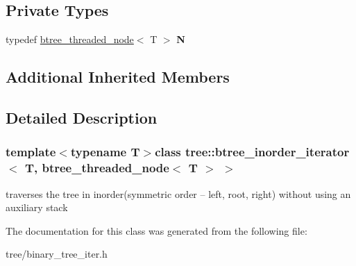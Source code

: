\subsection*{Private Types}
\begin{DoxyCompactItemize}
\item 
\hypertarget{classtree_1_1btree__inorder__iterator_3_01T_00_01btree__threaded__node_3_01T_01_4_01_4_a5c79484a07c883063ddbf6a545880231}{typedef \hyperlink{structtree_1_1btree__threaded__node}{btree\-\_\-threaded\-\_\-node}$<$ T $>$ {\bfseries N}}\label{classtree_1_1btree__inorder__iterator_3_01T_00_01btree__threaded__node_3_01T_01_4_01_4_a5c79484a07c883063ddbf6a545880231}

\end{DoxyCompactItemize}
\subsection*{Additional Inherited Members}


\subsection{Detailed Description}
\subsubsection*{template$<$typename T$>$class tree\-::btree\-\_\-inorder\-\_\-iterator$<$ T, btree\-\_\-threaded\-\_\-node$<$ T $>$ $>$}

traverses the tree in inorder(symmetric order -- left, root, right) without using an auxiliary stack 

The documentation for this class was generated from the following file\-:\begin{DoxyCompactItemize}
\item 
tree/binary\-\_\-tree\-\_\-iter.\-h\end{DoxyCompactItemize}
